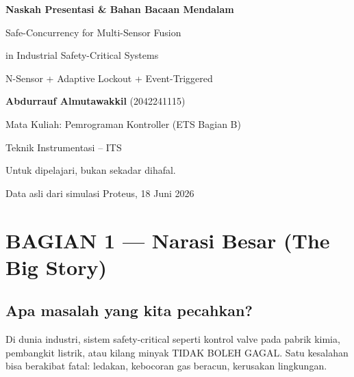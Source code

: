 \documentclass[12pt,a4paper]{article}
\begin{document}
\begin{titlepage}
\centering
\vspace*{3cm}

{\fontsize{18}{22}\selectfont\bfseries Naskah Presentasi \& Bahan Bacaan Mendalam\par}
\vspace{0.8cm}
{\fontsize{14}{17}\selectfont Safe-Concurrency for Multi-Sensor Fusion\par}
{\fontsize{14}{17}\selectfont in Industrial Safety-Critical Systems\par}
\vspace{0.5cm}
{\fontsize{12}{14}\selectfont N-Sensor + Adaptive Lockout + Event-Triggered\par}

\vspace{2cm}
{\large\textbf{Abdurrauf Almutawakkil} (2042241115)\par}
\vspace{0.3cm}
{\large Mata Kuliah: Pemrograman Kontroller (ETS Bagian B)\par}
\vspace{0.3cm}
{\large Teknik Instrumentasi -- ITS\par}

\vspace{2cm}
{\normalsize Untuk dipelajari, bukan sekadar dihafal.\par}
\vspace{0.3cm}
{\normalsize Data asli dari simulasi Proteus, 18 Juni 2026\par}

\vfill
\end{titlepage}

\section{BAGIAN 1 --- Narasi Besar (The Big Story)}

\subsection{Apa masalah yang kita pecahkan?}

Di dunia industri, sistem safety-critical seperti kontrol valve pada pabrik kimia,
pembangkit listrik, atau kilang minyak TIDAK BOLEH GAGAL. Satu kesalahan bisa
berakibat fatal: ledakan, kebocoran gas beracun, kerusakan lingkungan.
\end{document}
